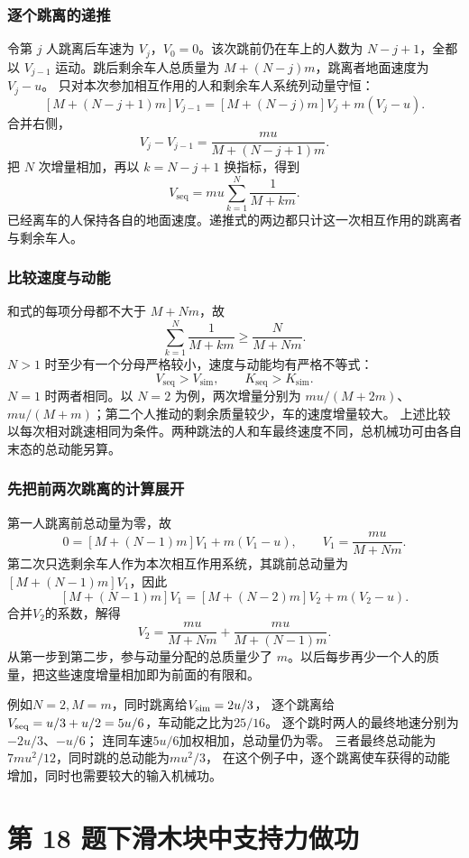 \documentclass[UTF8,fontset=fandol,a4paper,11pt]{ctexart}
\begin{document}
\subsubsection*{逐个跳离的递推}
令第 $j$ 人跳离后车速为 $V_j$，$V_0=0$。该次跳前仍在车上的人数为 $N-j+1$，全都以 $V_{j-1}$ 运动。跳后剩余车人总质量为 $M+(N-j)m$，跳离者地面速度为 $V_j-u$。
只对本次参加相互作用的人和剩余车人系统列动量守恒：
\[
[M+(N-j+1)m]V_{j-1}
=[M+(N-j)m]V_j+m(V_j-u).
\]
合并右侧，
\[
\boxed{V_j-V_{j-1}
=\frac{mu}{M+(N-j+1)m}}.
\]
把 $N$ 次增量相加，再以 $k=N-j+1$ 换指标，得到
\[
\boxed{V_{\mathrm{seq}}=mu\sum_{k=1}^{N}\frac1{M+km}}.
\]
已经离车的人保持各自的地面速度。递推式的两边都只计这一次相互作用的跳离者与剩余车人。

\subsubsection*{比较速度与动能}
和式的每项分母都不大于 $M+Nm$，故
\[
\sum_{k=1}^{N}\frac1{M+km}
\geq\frac{N}{M+Nm}.
\]
$N>1$ 时至少有一个分母严格较小，速度与动能均有严格不等式：
\[
\boxed{V_{\mathrm{seq}}>V_{\mathrm{sim}},\qquad
K_{\mathrm{seq}}>K_{\mathrm{sim}}}.
\]
$N=1$ 时两者相同。以 $N=2$ 为例，两次增量分别为 $mu/(M+2m)$、$mu/(M+m)$；第二个人推动的剩余质量较少，车的速度增量较大。
上述比较以每次相对跳速相同为条件。两种跳法的人和车最终速度不同，总机械功可由各自末态的总动能另算。
\subsubsection*{先把前两次跳离的计算展开}
第一人跳离前总动量为零，故
\[
0=[M+(N-1)m]V_1+m(V_1-u),
\qquad V_1=\frac{mu}{M+Nm}.
\]
第二次只选剩余车人作为本次相互作用系统，其跳前总动量为
$[M+(N-1)m]V_1$，因此
\[
[M+(N-1)m]V_1=[M+(N-2)m]V_2+m(V_2-u).
\]
合并$V_2$的系数，解得
\[
V_2=\frac{mu}{M+Nm}+\frac{mu}{M+(N-1)m}.
\]
从第一步到第二步，参与动量分配的总质量少了 $m$。以后每步再少一个人的质量，把这些速度增量相加即为前面的有限和。

例如$N=2,M=m$，同时跳离给$V_{\rm sim}=2u/3$，
逐个跳离给$V_{\rm seq}=u/3+u/2=5u/6$，车动能之比为$25/16$。
逐个跳时两人的最终地速分别为$-2u/3$、$-u/6$；
连同车速$5u/6$加权相加，总动量仍为零。
三者最终总动能为$7mu^2/12$，同时跳的总动能为$mu^2/3$，
在这个例子中，逐个跳离使车获得的动能增加，同时也需要较大的输入机械功。




\section*{第 18 题\quad 下滑木块中支持力做功}
\end{document}
